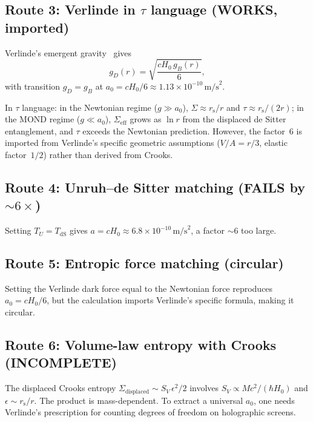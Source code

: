 \documentclass[aps,prd,preprint,superscriptaddress,longbibliography]{revtex4-2}
\newcommand{\tauasym}{\tau}
\newcommand{\rs}{r_{\mathrm{s}}}
\newcommand{\azero}{a_0}
\begin{document}
\subsection{Route 3: Verlinde in $\tauasym$ language (WORKS, imported)}

Verlinde's emergent gravity~\cite{Verlinde2016} gives
\begin{equation}
g_D(r) = \sqrt{\frac{cH_0\,g_B(r)}{6}},
\label{eq:Verlinde}
\end{equation}
with transition $g_D = g_B$ at $\azero = cH_0/6 \approx
1.13\times 10^{-10}\,\mathrm{m/s}^2$.

In $\tauasym$ language: in the Newtonian regime ($g\gg\azero$),
$\Sigma \approx \rs/r$ and $\tauasym \approx \rs/(2r)$; in the MOND
regime ($g\ll\azero$), $\Sigma_{\mathrm{eff}}$ grows as $\ln r$
from the displaced de Sitter entanglement, and $\tauasym$ exceeds
the Newtonian prediction.  However, the factor~6 is imported from
Verlinde's specific geometric assumptions ($V/A = r/3$, elastic
factor~$1/2$) rather than derived from Crooks.

\subsection{Route 4: Unruh--de Sitter matching (FAILS by $\sim 6\times$)}

Setting $T_U = T_{\mathrm{dS}}$ gives $a = cH_0 \approx
6.8\times 10^{-10}\,\mathrm{m/s}^2$, a factor $\sim 6$ too large.

\subsection{Route 5: Entropic force matching (circular)}

Setting the Verlinde dark force equal to the Newtonian force
reproduces $\azero = cH_0/6$, but the calculation imports Verlinde's
specific formula, making it circular.

\subsection{Route 6: Volume-law entropy with Crooks (INCOMPLETE)}

The displaced Crooks entropy
$\Sigma_{\mathrm{displaced}} \sim S_V\,\epsilon^2/2$ involves
$S_V\propto Mc^2/(\hbar H_0)$ and $\epsilon\sim\rs/r$.  The product
is mass-dependent.  To extract a universal $\azero$, one needs
Verlinde's prescription for counting degrees of freedom on holographic
screens.
\end{document}
